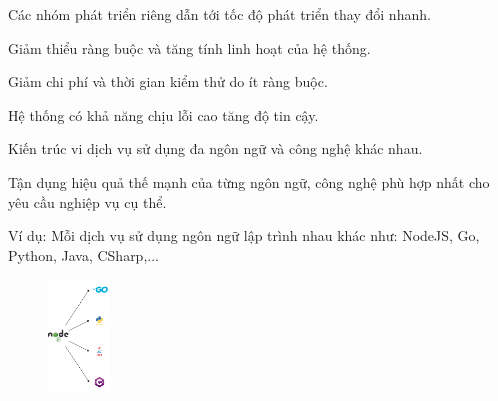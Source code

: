
Các nhóm phát triển riêng dẫn tới tốc độ phát triển thay đổi nhanh.

Giảm thiểu ràng buộc và tăng tính linh hoạt của hệ thống.

Giảm chi phí và thời gian kiểm thử do ít ràng buộc.

Hệ thống có khả năng chịu lỗi cao tăng độ tin cậy.

Kiến trúc vi dịch vụ sử dụng đa ngôn ngữ và công nghệ khác nhau.

Tận dụng hiệu quả thế mạnh của từng ngôn ngữ, công nghệ phù hợp nhất cho yêu cầu nghiệp vụ cụ thể.

Ví dụ: Mỗi dịch vụ sử dụng ngôn ngữ lập trình nhau khác như: NodeJS, Go, Python, Java, CSharp,...

\begin{figure}[h]

\centering

\includegraphics[height = 3cm]{pictures/DaNgonNgu/_DaNgonNgu.png}


\end{figure}


%




